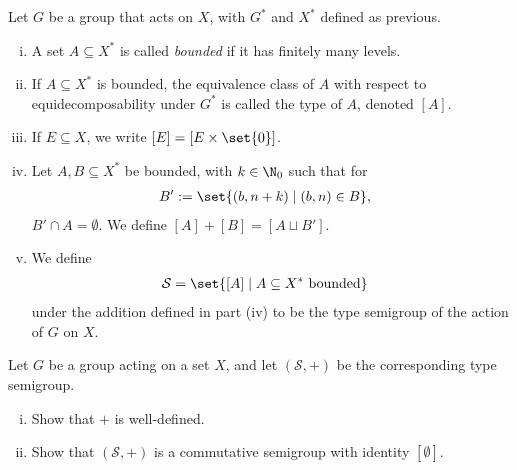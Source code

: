 \documentclass[10pt]{mypackage}
\begin{document}
  \begin{definition}
    Let $G$ be a group that acts on $X$, with $G^{\ast}$ and $X^{\ast}$ defined as previous.
    \begin{enumerate}[(i)]
      \item A set $A\subseteq X^{\ast}$ is called \textit{bounded} if it has finitely many levels.
      \item If $A\subseteq X^{\ast}$ is bounded, the equivalence class of $A$ with respect to equidecomposability under $G^{\ast}$ is called the type of $A$, denoted $[A]$.
      \item If $E\subseteq X$, we write $[E] = \left[E\times \set{0}\right]$.
      \item Let $A,B\subseteq X^{\ast}$ be bounded, with $k\in \N_0$ such that for
        \begin{align*}
          B' &:= \set{\left(b,n+k\right)\mid \left(b,n\right) \in B},
        \end{align*}
        $B'\cap A = \emptyset$. We define $[A] + [B] = \left[A \sqcup B'\right]$.
      \item We define
        \begin{align*}
          \mathcal{S} &= \set{[A]\mid A\subseteq X^{\ast}\text{ bounded}}
        \end{align*}
        under the addition defined in part (iv) to be the type semigroup of the action of $G$ on $X$.
    \end{enumerate}
  \end{definition}
  \begin{exercise}
    Let $G$ be a group acting on a set $X$, and let $\left(\mathcal{S},+\right)$ be the corresponding type semigroup.
    \begin{enumerate}[(i)]
      \item Show that $+$ is well-defined.
      \item Show that $\left(\mathcal{S},+\right)$ is a commutative semigroup with identity $\left[\emptyset\right]$.
    \end{enumerate}
  \end{exercise}
\end{document}
